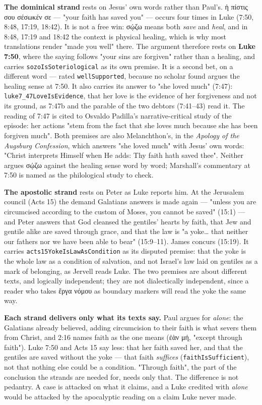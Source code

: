 \documentclass[11pt]{article}
\begin{document}
\textbf{The dominical strand} rests on Jesus' own words rather than Paul's. ἡ πίστις σου σέσωκέν σε — "your faith has saved you" — occurs four times in Luke (7:50, 8:48, 17:19, 18:42). It is not a free win: σῴζω means both \emph{save} and \emph{heal}, and in 8:48, 17:19 and 18:42 the context is physical healing, which is why most translations render "made you well" there. The argument therefore rests on \textbf{Luke 7:50}, where the saying follows "your sins are forgiven" rather than a healing, and carries \texttt{sozo\allowbreak{}Is\allowbreak{}Soteriological} as its own premise. It is a second bet, on a different word — rated \texttt{well\allowbreak{}Supported}, because no scholar found argues the healing sense at 7:50. It also carries its answer to "she loved much" (7:47): \texttt{luke7\_\allowbreak{}47\allowbreak{}Love\allowbreak{}Is\allowbreak{}Evidence}, that her love is the evidence of her forgiveness and not its ground, as 7:47b and the parable of the two debtors (7:41–43) read it. The reading of 7:47 is cited to Osvaldo Padilla's narrative-critical study of the episode: her actions "stem from the fact that she loves much because she has been forgiven much". Both premises are also Melanchthon's, in the \emph{Apology of the Augsburg Confession}, which answers "she loved much" with Jesus' own words: "Christ interprets Himself when He adds: Thy faith hath saved thee". Neither argues σῴζω against the healing sense word by word; Marshall's commentary at 7:50 is named as the philological study to check.

\textbf{The apostolic strand} rests on Peter as Luke reports him. At the Jerusalem council (Acts 15) the demand Galatians answers is made again — "unless you are circumcised according to the custom of Moses, you cannot be saved" (15:1) — and Peter answers that God cleansed the gentiles' hearts by faith, that Jew and gentile alike are saved through grace, and that the law is "a yoke… that neither our fathers nor we have been able to bear" (15:9–11). James concurs (15:19). It carries \texttt{acts15\allowbreak{}Yoke\allowbreak{}Is\allowbreak{}Law\allowbreak{}As\allowbreak{}Condition} as its disputed premise: that the yoke is the whole law as a condition of salvation, and not Israel's law laid on gentiles as a mark of belonging, as Jervell reads Luke. The two premises are about different texts, and logically independent; they are not dialectically independent, since a reader who takes ἔργα νόμου as boundary markers will read the yoke the same way.

\textbf{Each strand delivers only what its texts say.} Paul argues for \emph{alone}: the Galatians already believed, adding circumcision to their faith is what severs them from Christ, and 2:16 names faith as the one means (ἐὰν μή, "except through faith"). Luke 7:50 and Acts 15 say less: that her faith saved her, and that the gentiles are saved without the yoke — that faith \emph{suffices} (\texttt{faith\allowbreak{}Is\allowbreak{}Sufficient}), not that nothing else could be a condition. "Through faith", the part of the conclusion the strands are needed for, needs only that. The difference is not pedantry. A case is attacked on what it claims, and a Luke credited with \emph{alone} would be attacked by the apocalyptic reading on a claim Luke never made.
\end{document}
